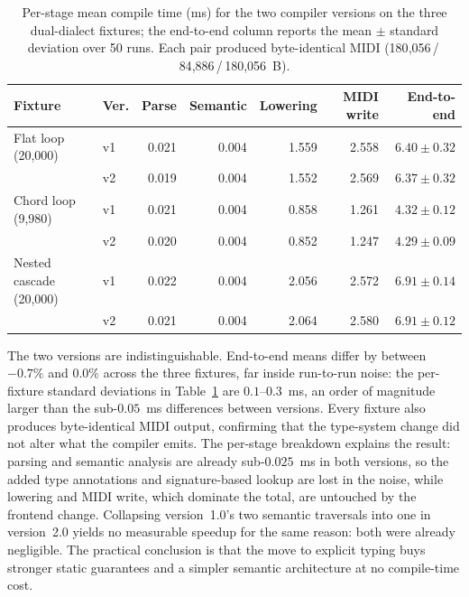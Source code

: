 \begin{table}[htbp]
  \centering
  \footnotesize
  \renewcommand{\arraystretch}{1.25}
  \begin{tabular}{llrrrrr}
    \toprule
    \textbf{Fixture} & \textbf{Ver.} & \textbf{Parse} & \textbf{Semantic} & \textbf{Lowering} & \textbf{MIDI write} &
    \textbf{End-to-end} \\
    \midrule
    Flat loop (20,000)        & v1 & 0.021 & 0.004 & 1.559 & 2.558 & $6.40 \pm 0.32$ \\
    & v2 & 0.019 & 0.004 & 1.552 & 2.569 & $6.37 \pm 0.32$ \\
    \midrule
    Chord loop (9,980)        & v1 & 0.021 & 0.004 & 0.858 & 1.261 & $4.32 \pm 0.12$ \\
    & v2 & 0.020 & 0.004 & 0.852 & 1.247 & $4.29 \pm 0.09$ \\
    \midrule
    Nested cascade (20,000)   & v1 & 0.022 & 0.004 & 2.056 & 2.572 & $6.91 \pm 0.14$ \\
    & v2 & 0.021 & 0.004 & 2.064 & 2.580 & $6.91 \pm 0.12$ \\
    \bottomrule
  \end{tabular}
  \caption{Per-stage mean compile time (ms) for the two compiler versions on the three dual-dialect fixtures; the
    end-to-end column reports the mean $\pm$ standard deviation over 50 runs. Each pair produced byte-identical MIDI
  (180{,}056\,/\,84{,}886\,/\,180{,}056~B).}\label{tab:typing-cost}
\end{table}

The two versions are indistinguishable.
End-to-end means differ by between $-0.7\%$ and $0.0\%$ across the three fixtures, far inside run-to-run noise: the
per-fixture standard deviations in Table~\ref{tab:typing-cost} are $0.1$--$0.3$~ms, an order of magnitude larger than
the sub-$0.05$~ms differences between versions.
Every fixture also produces byte-identical MIDI output, confirming that the type-system change did not alter what the
compiler emits.
The per-stage breakdown explains the result: parsing and semantic analysis are already sub-$0.025$~ms in both versions,
so the added type annotations and signature-based lookup are lost in the noise, while lowering and MIDI write, which
dominate the total, are untouched by the frontend change.
Collapsing version~1.0's two semantic traversals into one in version~2.0 yields no measurable speedup for the same
reason: both were already negligible.
The practical conclusion is that the move to explicit typing buys stronger static guarantees and a simpler semantic
architecture at no compile-time cost.
